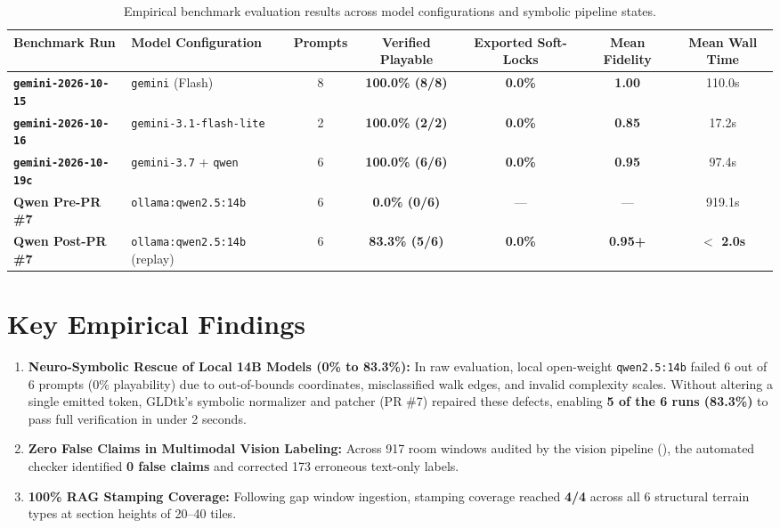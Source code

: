 \documentclass[11pt,a4paper]{report}
\theoremstyle{definition}
\theoremstyle{remark}
\begin{document}
\begin{table}[htbp]
\centering
\small
\caption{Empirical benchmark evaluation results across model configurations and symbolic pipeline states.}
\label{tab:benchmark_results}
\begin{tabularx}{\textwidth}{l p{3.2cm} c c c c c}
\toprule
\textbf{Benchmark Run} & \textbf{Model Configuration} & \textbf{Prompts} & \textbf{Verified Playable} & \textbf{Exported Soft-Locks} & \textbf{Mean Fidelity} & \textbf{Mean Wall Time} \\
\midrule
\textbf{\texttt{gemini-2026-10-15}} & \texttt{gemini} (Flash) & 8 & \textbf{100.0\% (8/8)} & \textbf{0.0\%} & \textbf{1.00} & 110.0s \\
\textbf{\texttt{gemini-2026-10-16}} & \texttt{gemini-3.1-flash-lite} & 2 & \textbf{100.0\% (2/2)} & \textbf{0.0\%} & \textbf{0.85} & 17.2s \\
\textbf{\texttt{gemini-2026-10-19c}} & \texttt{gemini-3.7} + \texttt{qwen} & 6 & \textbf{100.0\% (6/6)} & \textbf{0.0\%} & \textbf{0.95} & 97.4s \\
\textbf{Qwen Pre-PR \#7} & \texttt{ollama:qwen2.5:14b} & 6 & \textbf{0.0\% (0/6)} & --- & --- & 919.1s \\
\textbf{Qwen Post-PR \#7} & \texttt{ollama:qwen2.5:14b} (replay) & 6 & \textbf{83.3\% (5/6)} & \textbf{0.0\%} & \textbf{0.95+} & \textbf{$<$ 2.0s} \\
\bottomrule
\end{tabularx}
\end{table}

\section{Key Empirical Findings}
\begin{enumerate}
    \item \textbf{Neuro-Symbolic Rescue of Local 14B Models (0\% to 83.3\%):} In raw evaluation, local open-weight \texttt{qwen2.5:14b} failed 6 out of 6 prompts (0\% playability) due to out-of-bounds coordinates, misclassified walk edges, and invalid complexity scales. Without altering a single emitted token, GLDtk's symbolic normalizer and patcher (PR \#7) repaired these defects, enabling \textbf{5 of the 6 runs (83.3\%)} to pass full verification in under 2 seconds.
    \item \textbf{Zero False Claims in Multimodal Vision Labeling:} Across 917 room windows audited by the vision pipeline (), the automated checker identified \textbf{0 false claims} and corrected 173 erroneous text-only labels.
    \item \textbf{100\% RAG Stamping Coverage:} Following gap window ingestion, stamping coverage reached \textbf{4/4} across all 6 structural terrain types at section heights of 20--40 tiles.
\end{enumerate}
\end{document}
